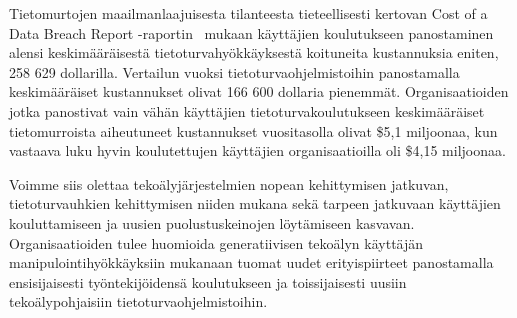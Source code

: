 \begin{otherlanguage}{finnish}
Tietomurtojen maailmanlaajuisesta tilanteesta tieteellisesti kertovan Cost of a Data Breach Report -raportin~\citep{ibm_Cost_Data_Breach_Report_2024} mukaan käyttäjien koulutukseen panostaminen alensi keskimääräisestä tietoturvahyökkäyksestä koituneita kustannuksia eniten, 258 629 dollarilla. Vertailun vuoksi tietoturvaohjelmistoihin panostamalla keskimääräiset kustannukset olivat 166 600 dollaria pienemmät. Organisaatioiden jotka panostivat vain vähän käyttäjien tietoturvakoulutukseen keskimääräiset tietomurroista aiheutuneet kustannukset vuositasolla olivat \$5,1 miljoonaa, kun vastaava luku hyvin koulutettujen käyttäjien organisaatioilla oli \$4,15 miljoonaa.



Voimme siis olettaa tekoälyjärjestelmien nopean kehittymisen jatkuvan, tietoturvauhkien kehittymisen niiden mukana sekä tarpeen jatkuvaan käyttäjien kouluttamiseen ja uusien puolustuskeinojen löytämiseen kasvavan. Organisaatioiden tulee huomioida generatiivisen tekoälyn käyttäjän manipulointihyökkäyksiin mukanaan tuomat uudet erityispiirteet panostamalla ensisijaisesti työntekijöidensä koulutukseen ja toissijaisesti uusiin tekoälypohjaisiin tietoturvaohjelmistoihin.





\end{otherlanguage}


